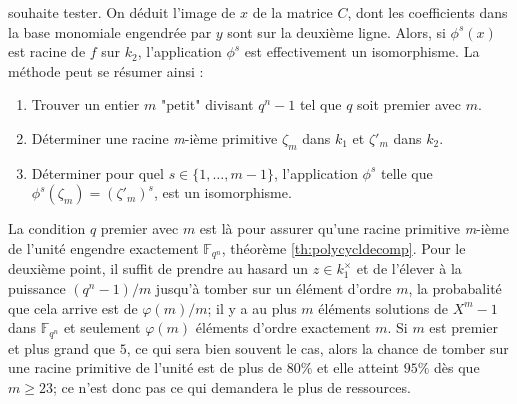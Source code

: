 \documentclass[a4paper]{article} %
\numberwithin{section}{part}
\numberwithin{equation}{section}
\newcommand\nroot[1]{\textit{#1}-ième}
\newcommand\GF[1]{\mathbb{F}_{#1}}
\begin{document}
souhaite tester. On déduit l'image de $x$ de la matrice $C$, dont les 
coefficients dans la base monomiale engendrée par $y$ sont sur la deuxième 
ligne. Alors, si $\phi^s(x)$ est racine de $f$ sur $k_2$, l'application $\phi^s$
est effectivement un isomorphisme. La méthode peut se résumer ainsi :
\vspace{0.3cm}
\begin{enumerate}[1.]
\item Trouver un entier $m$ "petit" divisant $q^n - 1$ tel que 
$q$ soit premier avec $m$. 

\item Déterminer une racine \nroot{m} primitive $\zeta_m$ dans $k_1$ et
$\zeta'_m$ dans $k_2$.

\item  Déterminer pour quel $s\in \lbrace{1,\dots,m-1}\rbrace$, l'application
$\phi^s$ telle que $\phi^s(\zeta_m) = (\zeta'_m)^s$, est un isomorphisme.
\end{enumerate}
\vspace{0.3cm}
La condition $q$ premier avec $m$ est là pour assurer qu'une racine primitive
\nroot{m} de l'unité engendre exactement $\GF{q^n}$, théorème
\ref{th:polycycldecomp}. Pour le deuxième point, il suffit de prendre au hasard 
un $z\in k_1^{\times}$ et de l'élever à la puissance $(q^n - 1)/m$ jusqu'à 
tomber sur un élément d'ordre $m$, la probabalité que cela arrive est de 
$\varphi(m)/m$; il y a au plus $m$ éléments solutions de $X^m - 1$ dans 
$\GF{q^n}$ et seulement $\varphi(m)$ éléments d'ordre exactement $m$. Si $m$ est
premier et plus grand que $5$, ce qui sera bien souvent le cas, alors la chance 
de tomber sur une racine primitive de l'unité est de plus de $80\%$ et elle 
atteint $95\%$ dès que $m \geq 23$; ce n'est donc pas ce qui demandera le plus
de ressources. 
\end{document}

